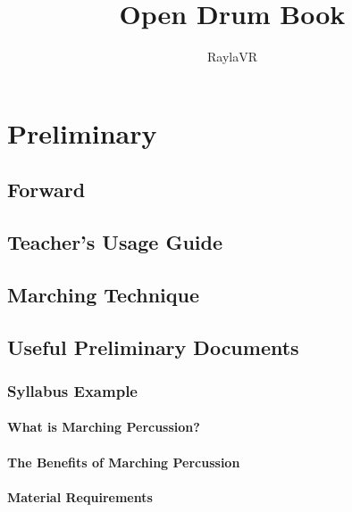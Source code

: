 \documentclass[12pt,letterpaper]{book}
\title{Open Drum Book}
\author{RaylaVR}
\begin{document}
\maketitle
\newpage
{}
\tableofcontents







\part{Preliminary}


\chapter*{Forward}

\chapter*{Teacher's Usage Guide}

\chapter*{Marching Technique}

\chapter*{Useful Preliminary Documents}
\newpage

\section*{Syllabus Example}
\subsection*{What is Marching Percussion?}
\subsection*{The Benefits of Marching Percussion}
\subsection*{Material Requirements}
\end{document}
